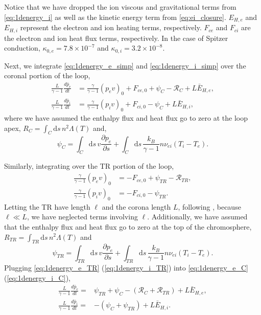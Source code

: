 \documentclass[apj]{emulateapj}
\begin{document}
	Notice that we have dropped the ion viscous and gravitational terms from  \autoref{eq:1denergy_i} as well as the kinetic energy term from \autoref{eq:ei_closure}. $E_{H,e}$ and $E_{H,i}$ represent the electron and ion heating terms, respectively. $F_{ce}$ and $F_{ci}$ are the electron and ion heat flux terms, respectively. In the case of Spitzer conduction, $\kappa_{0,e}=7.8\times10^{-7}$ and $\kappa_{0,i}=3.2\times10^{-8}$.
	\par Next, we integrate \autoref{eq:1denergy_e_simp} and \autoref{eq:1denergy_i_simp} over the coronal portion of the loop,
	\begin{align}
		\frac{L}{\gamma - 1}\frac{d \bar{p}_e}{dt} &= \frac{\gamma}{\gamma - 1}(p_ev)_0 + F_{ce,0} + \psi_C - \mathcal{R}_C + L\bar{E}_{H,e},\label{eq:1denergy_e_C} \\[0.5em]
		\frac{L}{\gamma - 1}\frac{d \bar{p}_i}{dt} &= \frac{\gamma}{\gamma - 1}(p_iv)_0 + F_{ci,0} - \psi_C + L\bar{E}_{H,i},\label{eq:1denergy_i_C}
	\end{align}
	where we have assumed the enthalpy flux and heat flux go to zero at the loop apex, $R_C=\int_C\mathrm{d}s\,n^2\Lambda(T)$ and,
	\begin{equation} 
		\psi_C=\int_C\mathrm{d}s\,v\frac{\partial p_e}{\partial s} + \int_C\mathrm{d}s\,\frac{k_B}{\gamma - 1}n\nu_{ei}(T_i - T_e).
	\end{equation}
	\par Similarly, integrating over the TR portion of the loop,
	\begin{align}
		\frac{\gamma}{\gamma - 1}(p_ev)_0 &= - F_{ce,0} + \psi_{TR} - \mathcal{R}_{TR}, \label{eq:1denergy_e_TR} \\[0.5em]
		\frac{\gamma}{\gamma - 1}(p_iv)_0 &=  - F_{ci,0} - \psi_{TR}. \label{eq:1denergy_i_TR}
	\end{align}
	Letting the TR have length $\ell$ and the corona length $L$, following \citet{klimchuk_highly_2008}, because $\ell\ll L$, we have neglected terms involving $\ell$. Additionally, we have assumed that the enthalpy flux and heat flux go to zero at the top of the chromosphere, $R_{TR}=\int_{TR}\mathrm{d}s\,n^2\Lambda(T)$ and
	\begin{equation}
		\psi_{TR}=\int_{TR}\mathrm{d}s\,v\frac{\partial p_e}{\partial s} + \int_{TR}\mathrm{d}s\,\frac{k_B}{\gamma - 1}n\nu_{ei}(T_i - T_e).
	\end{equation}
	Plugging \autoref{eq:1denergy_e_TR} (\autoref{eq:1denergy_i_TR}) into \autoref{eq:1denergy_e_C} (\autoref{eq:1denergy_i_C}),
	\begin{align}
		\frac{L}{\gamma - 1}\frac{d\bar{p}_e}{dt} =& \psi_{TR} + \psi_C -(\mathcal{R}_C + \mathcal{R}_{TR}) + L\bar{E}_{H,e},\label{eq:0d_press_e_sub} \\[0.5em]
		\frac{L}{\gamma - 1}\frac{d\bar{p}_i}{dt} =& -(\psi_{C} + \psi_{TR}) +  L\bar{E}_{H,i}.\label{eq:0d_press_i_sub}
	\end{align}
\end{document}
